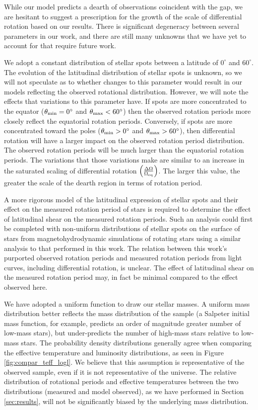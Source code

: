 While our model predicts a dearth of observations coincident with the gap, we are hesitant to suggest a prescription for the growth of the scale of differential rotation based on our results.
There is significant degeneracy between several parameters in our work, and there are still many unknowns that we have yet to account for that require future work.

We adopt a constant distribution of stellar spots between a latitude of $0^{\circ}$ and $60^{\circ}$.
The evolution of the latitudinal distribution of stellar spots is unknown, so we will not speculate as to whether changes to this parameter would result in our models reflecting the observed rotational distribution.
However, we will note the effects that variations to this parameter have.
If spots are more concentrated to the equator ($\theta_{\rm{min}} = 0^{\circ}$ and $\theta_{\rm{max}} < 60^{\circ}$) then the observed rotation periods more closely reflect the equatorial rotation periods.
Conversely, if spots are more concentrated toward the poles ($\theta_{\rm{min}} > 0^{\circ}$ and $\theta_{\rm{max}} > 60^{\circ}$), then differential rotation will have a larger impact on the observed rotation period distribution.
The observed rotation periods will be much larger than the equatorial rotation periods.
The variations that those variations make are similar to an increase in the saturated scaling of differential rotation $\left(\frac{\Delta\Omega}{\Omega_{\rm{eq}}}\right)$.
The larger this value, the greater the scale of the dearth region in terms of rotation period.

A more rigorous model of the latitudinal expression of stellar spots and their effect on the measured rotation period of stars is required to determine the effect of latitudinal shear on the measured rotation periods.
Such an analysis could first be completed with non-uniform distributions of stellar spots on the surface of stars from magnetohydrodynamic simulations of rotating stars using a similar analysis to that performed in this work. 
The relation between this work's purported observed rotation periods and measured rotation periods from light curves, including differential rotation, is unclear.
The effect of latitudinal shear on the measured rotation period may, in fact be minimal compared to the effect observed here.

We have adopted a uniform function to draw our stellar masses.
A uniform mass distribution better reflects the mass distribution of the \citet{mcquillan_rotation_2014} sample (a Salpeter initial mass function, for example, predicts an order of magnitude greater number of low-mass stars), but under-predicts the number of high-mass stars relative to low-mass stars.
The probability density distributions generally agree when comparing the effective temperature and luminosity distributions, as seen in Figure \ref{fig:compar_teff_logl}.
We believe that this assumption is representative of the observed sample, even if it is not representative of the universe.
The relative distribution of rotational periods and effective temperatures between the two distributions (measured and model observed), as we have performed in Section \ref{sec:results}, will not be significantly biased by the underlying mass distribution.

